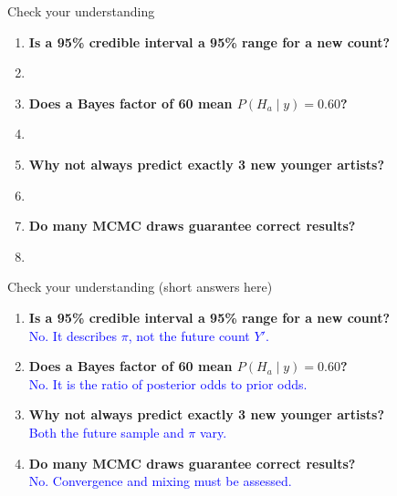 \documentclass[aspectratio=43]{beamer}
\begin{document}
\begin{frame}{Check your understanding}
\small
\begin{enumerate}
\item \textbf{Is a 95\% credible interval a 95\% range for a new count?}\\
\item[] 
\item \textbf{Does a Bayes factor of 60 mean $P(H_a\mid y)=0.60$?}\\
\item[]
\item \textbf{Why not always predict exactly 3 new younger artists?}\\
\item[]
\item \textbf{Do many MCMC draws guarantee correct results?}\\
\item[]
\end{enumerate}
\end{frame}

\begin{frame}{Check your understanding (short answers here)}
\small
\begin{enumerate}
\item \textbf{Is a 95\% credible interval a 95\% range for a new count?}\\
\textcolor{blue}{No. It describes $\pi$, not the future count $Y'$.}
\item \textbf{Does a Bayes factor of 60 mean $P(H_a\mid y)=0.60$?}\\
\textcolor{blue}{No. It is the ratio of posterior odds to prior odds.}
\item \textbf{Why not always predict exactly 3 new younger artists?}\\
\textcolor{blue}{Both the future sample and $\pi$ vary.}
\item \textbf{Do many MCMC draws guarantee correct results?}\\
\textcolor{blue}{No. Convergence and mixing must be assessed.}
\end{enumerate}
\end{frame}
\end{document}
